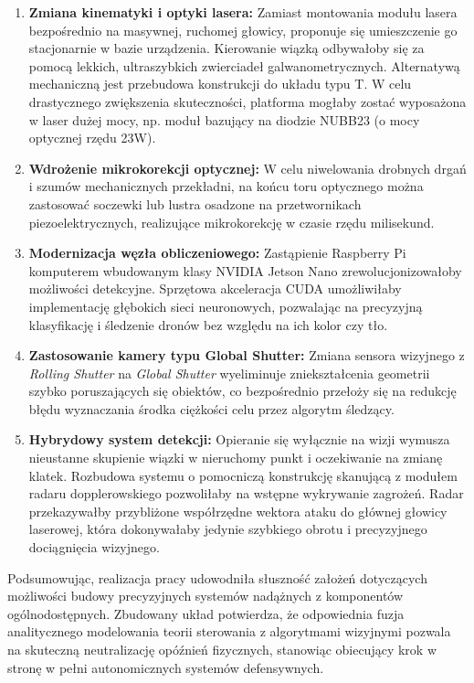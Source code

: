 \documentclass[a4paper,twoside,12pt]{book}
\begin{document}
\begin{enumerate}
    \item \textbf{Zmiana kinematyki i optyki lasera:} Zamiast montowania modułu lasera bezpośrednio na masywnej, ruchomej głowicy, proponuje się umieszczenie go stacjonarnie w bazie urządzenia. Kierowanie wiązką odbywałoby się za pomocą lekkich, ultraszybkich zwierciadeł galwanometrycznych. Alternatywą mechaniczną jest przebudowa konstrukcji do układu typu T. W celu drastycznego zwiększenia skuteczności, platforma mogłaby zostać wyposażona w laser dużej mocy, np. moduł bazujący na diodzie NUBB23 (o mocy optycznej rzędu 23W).
    
    \item \textbf{Wdrożenie mikrokorekcji optycznej:} W celu niwelowania drobnych drgań i szumów mechanicznych przekładni, na końcu toru optycznego można zastosować soczewki lub lustra osadzone na przetwornikach piezoelektrycznych, realizujące mikrokorekcję w czasie rzędu milisekund.
    
    \item \textbf{Modernizacja węzła obliczeniowego:} Zastąpienie Raspberry Pi komputerem wbudowanym klasy NVIDIA Jetson Nano zrewolucjonizowałoby możliwości detekcyjne. Sprzętowa akceleracja CUDA umożliwiłaby implementację głębokich sieci neuronowych, pozwalając na precyzyjną klasyfikację i śledzenie dronów bez względu na ich kolor czy tło.
    
    \item \textbf{Zastosowanie kamery typu Global Shutter:} Zmiana sensora wizyjnego z \textit{Rolling Shutter} na \textit{Global Shutter} wyeliminuje zniekształcenia geometrii szybko poruszających się obiektów, co bezpośrednio przełoży się na redukcję błędu wyznaczania środka ciężkości celu przez algorytm śledzący.
    
    \item \textbf{Hybrydowy system detekcji:} Opieranie się wyłącznie na wizji wymusza nieustanne skupienie wiązki w nieruchomy punkt i oczekiwanie na zmianę klatek. Rozbudowa systemu o pomocniczą konstrukcję skanującą z modułem radaru dopplerowskiego pozwoliłaby na wstępne wykrywanie zagrożeń. Radar przekazywałby przybliżone współrzędne wektora ataku do głównej głowicy laserowej, która dokonywałaby jedynie szybkiego obrotu i precyzyjnego dociągnięcia wizyjnego.
\end{enumerate}

Podsumowując, realizacja pracy udowodniła słuszność założeń dotyczących możliwości budowy precyzyjnych systemów nadążnych z komponentów ogólnodostępnych. Zbudowany układ potwierdza, że odpowiednia fuzja analitycznego modelowania teorii sterowania z algorytmami wizyjnymi pozwala na skuteczną neutralizację opóźnień fizycznych, stanowiąc obiecujący krok w stronę w pełni autonomicznych systemów defensywnych.
\end{document}
